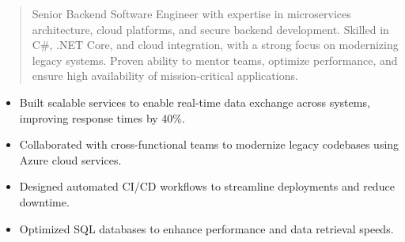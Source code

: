 



\makecvheader

\begin{quote}
  \noindent
  Senior Backend Software Engineer with expertise in microservices architecture, cloud platforms, and secure backend development. Skilled in C#, .NET Core, and cloud integration, with a strong focus on modernizing legacy systems. Proven ability to mentor teams, optimize performance, and ensure high availability of mission-critical applications.
\end{quote}

\par\smallskip
\noindent
\begin{minipage}{20cm}
  \begin{minipage}{9.75cm}
    \begin{itemize}
      \item Built scalable services to enable real-time data exchange across systems, improving response times by 40\%.
      \item Collaborated with cross-functional teams to modernize legacy codebases using Azure cloud services.
    \end{itemize}
  \end{minipage}
  \hfill
  \begin{minipage}{9.75cm}
    \begin{itemize}
      \item Designed automated CI/CD workflows to streamline deployments and reduce downtime.
      \item Optimized SQL databases to enhance performance and data retrieval speeds.
    \end{itemize}
  \end{minipage}
\end{minipage}
\par\smallskip
\divider

